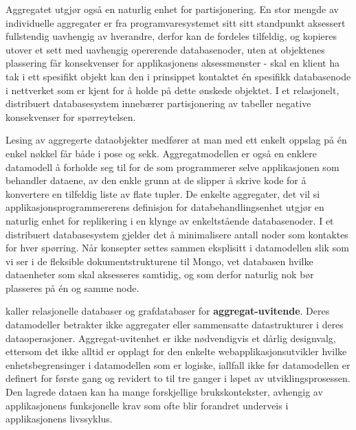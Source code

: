 Aggregatet utgjør også en naturlig enhet for partisjonering. En stor mengde av individuelle aggregater er fra programvaresystemet sitt sitt standpunkt aksessert fullstendig uavhengig av hverandre, derfor kan de fordeles tilfeldig, og kopieres utover et sett med uavhengig opererende databasenoder, uten at objektenes plassering får konsekvenser for applikasjonens aksessmønster - skal en klient ha tak i ett spesifikt objekt kan den i prinsippet kontaktet én spesifikk databasenode i nettverket som er kjent for å holde på dette ønskede objektet. I et relasjonelt, distribuert databasesystem innebærer partisjonering av tabeller negative konsekvenser for spørreytelsen.%

Lesing av aggregerte dataobjekter medfører at man med ett enkelt oppslag på én enkel nøkkel får både i pose og sekk. Aggregatmodellen er også en enklere datamodell å forholde seg til for de som programmerer selve applikasjonen som behandler dataene, av den enkle grunn at de slipper å skrive kode for å konvertere en tilfeldig liste av flate tupler. De enkelte aggregater, det vil si applikasjonsprogrammererens definisjon for databehandlingsenhet utgjør en naturlig enhet for replikering i en klynge av enkeltstående databasenoder. I et distribuert databasesystem gjelder det å minimalisere antall noder som kontaktes for hver spørring. Når konsepter settes sammen eksplisitt i datamodellen slik som vi ser i de fleksible dokumentstrukturene til Mongo, vet databasen hvilke dataenheter som skal aksesseres samtidig, og som derfor naturlig nok bør plasseres på én og samme node.

\cite{sadalage2013} kaller relasjonelle databaser og grafdatabaser for \textbf{aggregat-uvitende}. Deres datamodeller betrakter ikke aggregater eller sammensatte datastrukturer i deres dataoperasjoner. Aggregat-uvitenhet er ikke nødvendigvis et dårlig designvalg, ettersom det ikke alltid er opplagt for den enkelte webapplikasjonsutvikler hvilke enhetsbegrensinger i datamodellen som er logiske, iallfall ikke før datamodellen er definert for første gang og revidert to til tre ganger i løpet av utviklingsprosessen. Den lagrede dataen kan ha mange forskjellige brukskontekster, avhengig av applikasjonens funksjonelle krav som ofte blir forandret underveis i applikasjonens livssyklus.

